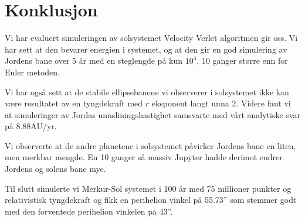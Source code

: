 \documentclass[reprint,english,notitlepage]{revtex4-1}
\begin{document}
\section{Konklusjon} %
	Vi har evaluert simuleringen av solsystemet Velocity Verlet algoritmen gir oss. Vi har sett at den bevarer energien i systemet, og at den gir en god simulering av Jordens bane over 5 år med en steglengde på kun $10^4$, 10 ganger større enn for Euler metoden.
	
	Vi har også sett at de stabile ellipsebanene vi observerer i solsystemet ikke kan være resultatet av en tyngdekraft med $r$ eksponent langt unna 2. Videre fant vi at simuleringer av Jordas unnsliningshastighet samsvarte med vårt analytiske svar på 8.88AU/yr.
	
	Vi observerte at de andre planetene i solsystemet påvirker Jordens bane en liten, men merkbar mengde. En 10 ganger så massiv Jupyter hadde derimot endrer Jordens og solens bane mye.
	
	Til slutt simulerte vi Merkur-Sol systemet i 100 år med 75 millioner punkter og relativistisk tyngdekraft og fikk en perihelion vinkel på 55.73'' som stemmer godt med den forventede perihelion vinkelen på 43''.

\begin{figure}  \end{figure}
	
\end{document}
